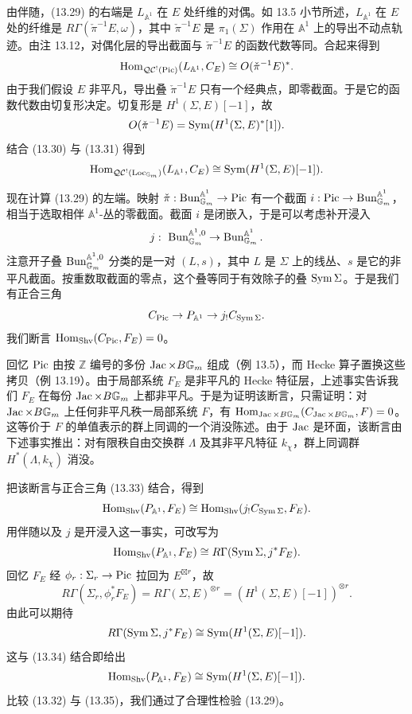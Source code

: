 由伴随，(13.29) 的右端是 $L_{\mathbb A^1}$ 在 $E$ 处纤维的对偶。如 13.5 小节所述，$L_{\mathbb A^1}$ 在 $E$ 处的纤维是 $R\Gamma(\check\pi^{-1}E,\omega)$，其中 $\check\pi^{-1}E$ 是 $\pi_1(\Sigma)$ 作用在 $\mathbb A^1$ 上的导出不动点轨迹。由注 13.12，对偶化层的导出截面与 $\check\pi^{-1}E$ 的函数代数等同。合起来得到
\begin{equation}
  \operatorname{Hom}_{\mathcal{QC}^!(\operatorname{Pic})}(L_{\mathbb A^1},C_E)\cong O(\check\pi^{-1}E)^*.
  \label{eq:13-30}
\end{equation}
由于我们假设 $E$ 非平凡，导出叠 $\check\pi^{-1}E$ 只有一个经典点，即零截面。于是它的函数代数由切复形决定。切复形是 $H^1(\Sigma,E)[-1]$，故
\begin{equation}
  O(\check\pi^{-1}E)=\operatorname{Sym}(H^1(\Sigma,E)^*[1]).
  \label{eq:13-31}
\end{equation}
结合 (13.30) 与 (13.31) 得到
\begin{equation}
  \operatorname{Hom}_{\mathcal{QC}^!(\operatorname{Loc}_{\mathbb G_m})}(L_{\mathbb A^1},C_E)\cong\operatorname{Sym}(H^1(\Sigma,E)[-1]).
  \label{eq:13-32}
\end{equation}

现在计算 (13.29) 的左端。映射 $\check\pi:\operatorname{Bun}^{\mathbb A^1}_{\mathbb G_m}\to\operatorname{Pic}$ 有一个截面 $i:\operatorname{Pic}\to\operatorname{Bun}^{\mathbb A^1}_{\mathbb G_m}$，相当于选取相伴 $\mathbb A^1$-丛的零截面。截面 $i$ 是闭嵌入，于是可以考虑补开浸入
\[
  j:\ \Bun^{\mathbb A^1,0}_{\mathbb G_m}\to\Bun^{\mathbb A^1}_{\mathbb G_m}.
\]
注意开子叠 $\operatorname{Bun}^{\mathbb A^1,0}_{\mathbb G_m}$ 分类的是一对 $(L,s)$，其中 $L$ 是 $\Sigma$ 上的线丛、$s$ 是它的非平凡截面。按重数取截面的零点，这个叠等同于有效除子的叠 $\operatorname{Sym}\Sigma$。于是我们有正合三角
\begin{equation}
  C_{\operatorname{Pic}}\to P_{\mathbb A^1}\to j_!C_{\operatorname{Sym}\Sigma}.
  \label{eq:13-33}
\end{equation}
我们断言 $\operatorname{Hom}_{\operatorname{Shv}}(C_{\operatorname{Pic}},F_E)=0$。

回忆 $\operatorname{Pic}$ 由按 $\mathbb Z$ 编号的多份 $\operatorname{Jac}\times B\mathbb G_m$ 组成（例 13.5），而 Hecke 算子置换这些拷贝（例 13.19）。由于局部系统 $F_E$ 是非平凡的 Hecke 特征层，上述事实告诉我们 $F_E$ 在每份 $\operatorname{Jac}\times B\mathbb G_m$ 上都非平凡。于是为证明该断言，只需证明：对 $\operatorname{Jac}\times B\mathbb G_m$ 上任何非平凡秩一局部系统 $F$，有 $\operatorname{Hom}_{\operatorname{Jac}\times B\mathbb G_m}(C_{\operatorname{Jac}\times B\mathbb G_m},F)=0$。这等价于 $F$ 的单值表示的群上同调的一个消没陈述。由于 $\operatorname{Jac}$ 是环面，该断言由下述事实推出：对有限秩自由交换群 $\Lambda$ 及其非平凡特征 $k_\chi$，群上同调群 $H^*(\Lambda,k_\chi)$ 消没。

把该断言与正合三角 (13.33) 结合，得到
\[
  \operatorname{Hom}_{\operatorname{Shv}}(P_{\mathbb A^1},F_E)\cong\operatorname{Hom}_{\operatorname{Shv}}(j_!C_{\operatorname{Sym}\Sigma},F_E).
\]
用伴随以及 $j$ 是开浸入这一事实，可改写为
\begin{equation}
  \operatorname{Hom}_{\operatorname{Shv}}(P_{\mathbb A^1},F_E)\cong R\Gamma(\operatorname{Sym}\Sigma,j^*F_E).
  \label{eq:13-34}
\end{equation}
回忆 $F_E$ 经 $\phi_r:\Sigma_r\to\operatorname{Pic}$ 拉回为 $E^{\boxtimes r}$，故
\[
  R\Gamma(\Sigma_r,\phi_r^*F_E)=R\Gamma(\Sigma,E)^{\otimes r}=(H^1(\Sigma,E)[-1])^{\otimes r}.
\]
由此可以期待
\[
  R\Gamma(\operatorname{Sym}\Sigma,j^*F_E)\cong\operatorname{Sym}(H^1(\Sigma,E)[-1]).
\]
这与 (13.34) 结合即给出
\begin{equation}
  \operatorname{Hom}_{\operatorname{Shv}}(P_{\mathbb A^1},F_E)\cong\operatorname{Sym}(H^1(\Sigma,E)[-1]).
  \label{eq:13-35}
\end{equation}
比较 (13.32) 与 (13.35)，我们通过了合理性检验 (13.29)。
